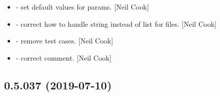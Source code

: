 \documentclass[a4paper,10pt,english]{report}
\begin{document}
\begin{itemize}
\item {} 
 - set default values for params. {[}Neil Cook{]}

\item {} 
 - correct how to handle string instead of list for
files. {[}Neil Cook{]}

\item {} 
 - remove test cases. {[}Neil Cook{]}

\item {} 
 - correct comment. {[}Neil Cook{]}

\end{itemize}


\subsection{0.5.037 (2019-07-10)}
\end{document}
